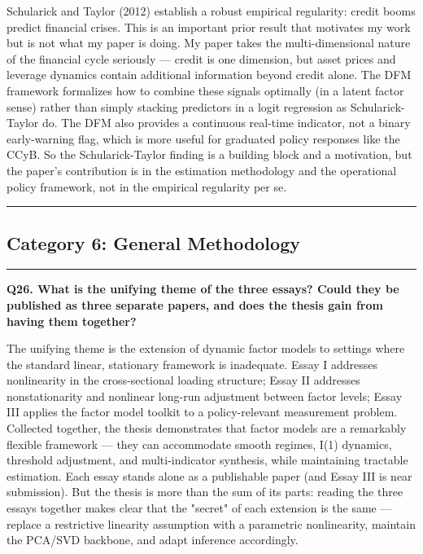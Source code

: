 \documentclass[11pt,a4paper]{article}
\begin{document}
Schularick and Taylor (2012) establish a robust empirical regularity: credit booms predict financial crises. This is an important prior result that motivates my work but is not what my paper is doing. My paper takes the multi-dimensional nature of the financial cycle seriously — credit is one dimension, but asset prices and leverage dynamics contain additional information beyond credit alone. The DFM framework formalizes how to combine these signals optimally (in a latent factor sense) rather than simply stacking predictors in a logit regression as Schularick-Taylor do. The DFM also provides a continuous real-time indicator, not a binary early-warning flag, which is more useful for graduated policy responses like the CCyB. So the Schularick-Taylor finding is a building block and a motivation, but the paper's contribution is in the estimation methodology and the operational policy framework, not in the empirical regularity per se.

\medskip\hrule\medskip

\subsection*{Category 6: General Methodology}

\medskip\hrule\medskip

\textbf{Q26. What is the unifying theme of the three essays? Could they be published as three separate papers, and does the thesis gain from having them together?}

The unifying theme is the extension of dynamic factor models to settings where the standard linear, stationary framework is inadequate. Essay I addresses nonlinearity in the cross-sectional loading structure; Essay II addresses nonstationarity and nonlinear long-run adjustment between factor levels; Essay III applies the factor model toolkit to a policy-relevant measurement problem. Collected together, the thesis demonstrates that factor models are a remarkably flexible framework — they can accommodate smooth regimes, I(1) dynamics, threshold adjustment, and multi-indicator synthesis, while maintaining tractable estimation. Each essay stands alone as a publishable paper (and Essay III is near submission). But the thesis is more than the sum of its parts: reading the three essays together makes clear that the "secret" of each extension is the same — replace a restrictive linearity assumption with a parametric nonlinearity, maintain the PCA/SVD backbone, and adapt inference accordingly.
\end{document}
